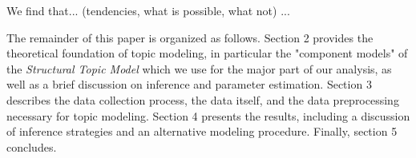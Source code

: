We find that... (tendencies, what is possible, what not) ...

The remainder of this paper is organized as follows. Section 2 provides the theoretical foundation of topic modeling, in particular the "component models" of the \textit{Structural Topic Model} which we use for the major part of our analysis, as well as a brief discussion on inference and parameter estimation. Section 3 describes the data collection process, the data itself, and the data preprocessing necessary for topic modeling. Section 4 presents the results, including a discussion of inference strategies and an alternative modeling procedure. Finally, section 5 concludes.

